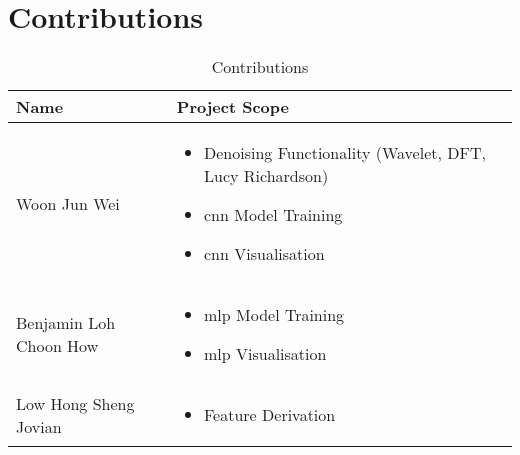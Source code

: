 \section{Contributions}\label{contribution}

\begin{table}[htbp]
  \caption{Contributions}\label{tab:contributions}
  \centering
  \begin{tabular}{p{4cm}|p{8cm}}
    \hline
    \textbf{Name} & \textbf{Project Scope} \\
    \hline
        Woon Jun Wei & 
        \begin{itemize}
            \item Denoising Functionality (Wavelet, DFT, Lucy Richardson)
            \item \gls{cnn} Model Training
            \item \gls{cnn} Visualisation
        \end{itemize}\\
        \hline
        Benjamin Loh Choon How & \begin{itemize}
            \item \gls{mlp} Model Training
            \item \gls{mlp} Visualisation
        \end{itemize}\\
        \hline
        Low Hong Sheng Jovian & \begin{itemize}
            \item Feature Derivation
        \end{itemize}\\
    \hline
  \end{tabular}
\end{table}